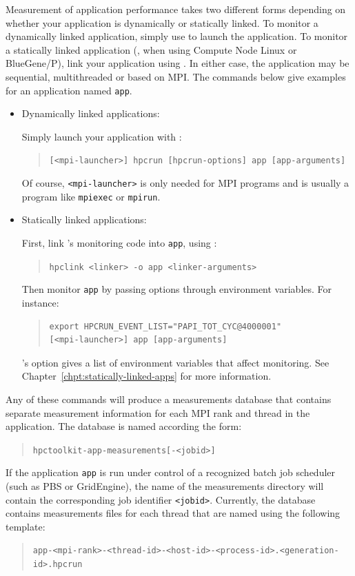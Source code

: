 \documentclass[11pt,letterpaper]{report}
\begin{document}
Measurement of application performance takes two different forms depending on whether your application is dynamically or statically linked.
To monitor a dynamically linked application, simply use \hpcrun{} to launch the application.
To monitor a statically linked application (\eg{}, when using Compute Node Linux or BlueGene/P), link your application using \hpclink{}.
In either case, the application may be sequential, multithreaded or based on MPI.
The commands below give examples for an application named \texttt{app}.
%
\begin{itemize}

\item Dynamically linked applications:\hfill

Simply launch your application with \hpcrun{}:
\begin{quote}
  \verb|[<mpi-launcher>] hpcrun [hpcrun-options] app [app-arguments]|
\end{quote}
Of course, \texttt{<mpi-launcher>} is only needed for MPI programs and is usually a program like \texttt{mpiexec} or \texttt{mpirun}.

\item Statically linked applications:\hfill

First, link \hpcrun{}'s monitoring code into \texttt{app}, using \hpclink{}:
\begin{quote}
  \verb|hpclink <linker> -o app <linker-arguments>|
\end{quote}

Then monitor \texttt{app} by passing \hpcrun{} options through environment variables.
For instance:
\begin{quote}
\begin{verbatim}
export HPCRUN_EVENT_LIST="PAPI_TOT_CYC@4000001"
[<mpi-launcher>] app [app-arguments]
\end{verbatim}
\end{quote}
\hpclink{}'s  option gives a list of environment variables that affect monitoring.
See Chapter~\ref{chpt:statically-linked-apps} for more information.

\end{itemize}
%
Any of these commands will produce a measurements database that contains separate measurement information for each MPI rank and thread in the application.
The database is named according the form:
\begin{quote}
  \verb|hpctoolkit-app-measurements[-<jobid>]|
\end{quote}
If the application \texttt{app} is run under control of a recognized batch job scheduler (such as PBS or GridEngine), the name of the measurements directory will contain the corresponding job identifier \texttt{<jobid>}.
Currently, the database contains measurements files for each thread that are named using the following template:
\begin{quote}
  \verb|app-<mpi-rank>-<thread-id>-<host-id>-<process-id>.<generation-id>.hpcrun|
\end{quote}
\end{document}
